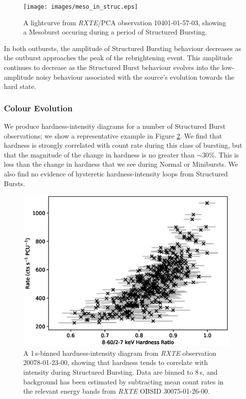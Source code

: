 \begin{figure}
  \centering
  \texttt{[image: images/meso\_in\_struc.eps]}
  \caption[A lightcurve from \textit{RXTE}/PCA observation 10401-01-57-03, showing a Mesoburst occuring during a period of Structured Bursting.]{\small A lightcurve from \textit{RXTE}/PCA observation 10401-01-57-03, showing a Mesoburst occuring during a period of Structured Bursting.}
  \label{fig:meso_in_struc}
\end{figure}

\par In both outbursts, the amplitude of Structured Bursting behaviour decreases as the outburst approaches the peak of the rebrightening event.  This amplitude continues to decrease as the Structured Burst behaviour evolves into the low-amplitude noisy behaviour associated with the source's evolution towards the hard state.

\subsubsection{Colour Evolution}

\par We produce hardness-intensity diagrams for a number of Structured Burst observations; we show a representative example in Figure \ref{fig:struc_hard}.  We find that hardness is strongly correlated with count rate during this class of bursting, but that the magnitude of the change in hardness is no greater than $\sim30\%$.  This is less than the change in hardness that we see during Normal or Minibursts.  We also find no evidence of hysteretic hardness-intensity loops from Structured Bursts.

\begin{figure}
  \centering
  \includegraphics[width=.9\linewidth, trim={0.4cm 0 1.cm 0},clip]{images/struc_hard.eps}
  \caption[A hardness-intensity diagram from \textit{RXTE} observation 20078-01-23-00, showing that hardness tends to correlate with intensity during Structured Bursting.]{\small A 1\,s-binned hardness-intensity diagram from \textit{RXTE} observation 20078-01-23-00, showing that hardness tends to correlate with intensity during Structured Bursting.  Data are binned to 8\,s, and background has been estimated by subtracting mean count rates in the relevant energy bands from \textit{RXTE} OBSID 30075-01-26-00.}
  \label{fig:struc_hard}
\end{figure}

